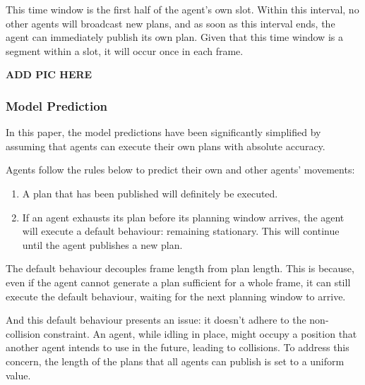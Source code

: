 This time window is the first half of the agent's own slot. Within this interval, no other agents will broadcast new plans, and as soon as this interval ends, the agent can immediately publish its own plan.
Given that this time window is a segment within a slot, it will occur once in each frame. 

\textbf{ADD PIC HERE}%

\subsubsection{Model Prediction}
\label{chap:model prediction}


In this paper, the model predictions have been significantly simplified by assuming that agents can execute their own plans with absolute accuracy.

Agents follow the rules below to predict their own and other agents' movements:
\begin{enumerate}
    \item A plan that has been published will definitely be executed.
    \item If an agent exhausts its plan before its planning window arrives, the agent will execute a default behaviour: remaining stationary. This will continue until the agent publishes a new plan.
\end{enumerate}

The default behaviour decouples frame length from plan length. This is because, even if the agent cannot generate a plan sufficient for a whole frame, it can still execute the default behaviour, waiting for the next planning window to arrive.

And this default behaviour presents an issue: it doesn't adhere to the non-collision constraint. An agent, while idling in place, might occupy a position that another agent intends to use in the future, leading to collisions.
To address this concern, the length of the plans that all agents can publish is set to a uniform value.


